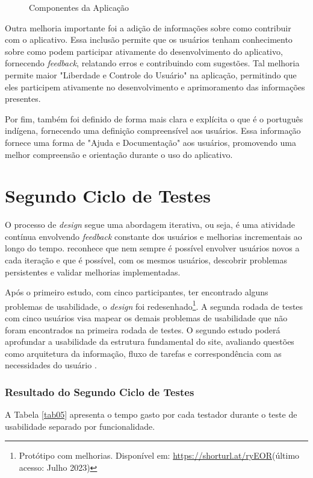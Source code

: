 \begin{figure}[h!]
	\centering
	\caption{Componentes da Aplicação}
	\label{fig25}
\end{figure}

Outra melhoria importante foi a adição de informações sobre como contribuir com o aplicativo. Essa inclusão permite que os usuários tenham conhecimento sobre como podem participar ativamente do desenvolvimento do aplicativo, 
fornecendo \textit{feedback}, relatando erros e contribuindo com sugestões. Tal melhoria permite maior "Liberdade e Controle do Usuário" na aplicação, permitindo que eles participem ativamente no desenvolvimento e aprimoramento 
das informações presentes.

Por fim, também foi definido de forma mais clara e explícita o que é o português indígena, fornecendo uma definição compreensível aos usuários. Essa informação fornece uma forma de "Ajuda e Documentação" aos usuários, promovendo uma melhor 
compreensão e orientação durante o uso do aplicativo.


\section{Segundo Ciclo de Testes}
\label{sec:Segundo Ciclo}
O processo de \textit{design} segue uma abordagem iterativa, ou seja, é uma atividade contínua envolvendo \textit{feedback} constante dos usuários e melhorias incrementais ao longo do tempo.  
reconhece que nem sempre é possível envolver usuários novos a cada iteração e que é possível, com os mesmos usuários, descobrir problemas persistentes e validar melhorias implementadas. 

Após o primeiro estudo, com cinco participantes, ter encontrado alguns problemas de usabilidade, o \textit{design} foi redesenhado\footnote{Protótipo com melhorias. Disponível em: \url{https://shorturl.at/ryEOR}(último acesso: Julho 2023)}. 
A segunda rodada de testes com cinco usuários visa mapear os demais problemas de usabilidade que não foram encontrados na primeira rodada de testes. O segundo estudo poderá aprofundar a usabilidade da estrutura fundamental do site, avaliando questões como arquitetura da informação, fluxo de tarefas e correspondência 
com as necessidades do usuário \cite{usabilitytest}.

\subsubsection{Resultado do Segundo Ciclo de Testes}
\label{sec:Resultado do Segundo Ciclo de Testes}
A Tabela \ref{tab05} apresenta o tempo gasto por cada testador durante o teste de usabilidade separado por funcionalidade.

